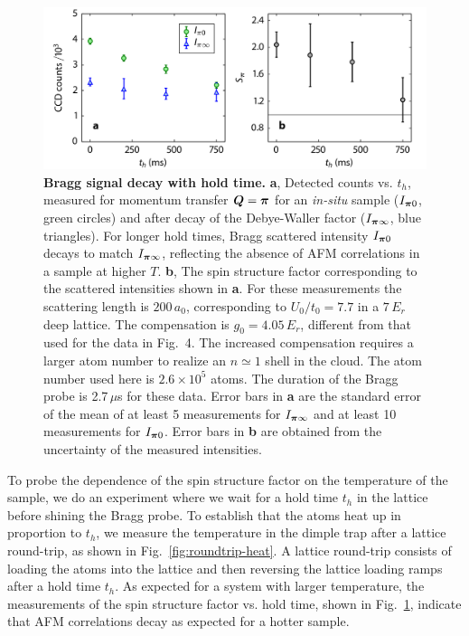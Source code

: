 \begin{figure}
\centering \includegraphics[width=135mm]{../figures/afmpaper/Hulet_EDfig4.png}
\caption{\textbf{Bragg signal decay with hold time.} \textbf{a}, Detected
counts vs. $t_{h}$, measured for momentum transfer $\bm{Q}=\bm{\pi}$ for
an \textit{in-situ} sample ($I_{\bm{\pi}0}$, green circles) and after decay of
the Debye-Waller factor ($I_{\bm{\pi}\infty}$, blue triangles).  For longer
hold times,  Bragg scattered intensity $I_{\bm{\pi}0}$ decays to match
$I_{\bm{\pi}\infty}$,  reflecting the absence of AFM correlations in a sample
at higher $T$.  \textbf{b}, The spin structure factor corresponding to the
scattered intensities shown in \textbf{a}.  For these measurements the
scattering length is $200\,a_{0}$, corresponding to $U_{0}/t_{0}=7.7$ in a
$7\,E_{r}$ deep lattice.  The compensation is $g_{0}=4.05\,E_{r}$, different
from that used for the data in Fig.~4.  The increased compensation requires a
larger atom number to realize an $n\simeq 1$ shell in the cloud.  The atom
number used here is $2.6\times10^{5}$ atoms.  The duration of the Bragg probe
is 2.7$\,\mu$s for these data.  Error bars in \textbf{a} are the standard error
of the mean of at least 5 measurements for $I_{\bm{\pi}\infty}$ and at least 10
measurements for $I_{\bm{\pi}0}$.  Error bars in \textbf{b} are obtained from
the uncertainty of the measured intensities.}
\label{fig:spidecay} 
\end{figure}

To probe the dependence of the spin structure factor on the temperature of the
sample, we do an experiment where we wait for a hold time $t_{h}$ in the
lattice before shining the Bragg probe.  To establish that the atoms heat up in
proportion to $t_{h}$, we measure the temperature in the dimple trap after a
lattice round-trip, as shown in Fig.~\ref{fig:roundtrip-heat}.  A lattice
round-trip consists of loading the atoms into the lattice and then reversing
the lattice loading ramps after a hold time $t_{h}$.  As expected for a system
with larger temperature, the measurements of the spin structure factor vs. hold
time, shown in Fig.~\ref{fig:spidecay}, indicate that AFM correlations decay as
expected for a hotter sample. 





